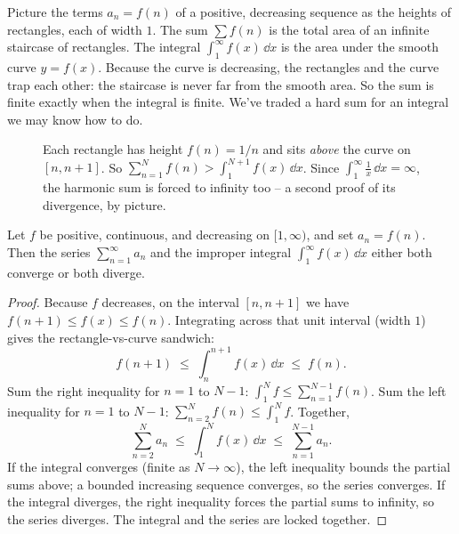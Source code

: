 \begin{intuitionbox}
Picture the terms $a_n = f(n)$ of a positive, decreasing sequence as the heights of rectangles, each of width $1$. The sum $\sum f(n)$ is the total area of an infinite staircase of rectangles. The integral $\int_1^\infty f(x)\,\dd x$ is the area under the smooth curve $y=f(x)$. Because the curve is decreasing, the rectangles and the curve trap each other: the staircase is never far from the smooth area. So the sum is finite exactly when the integral is finite. We've traded a hard sum for an integral we may know how to do.
\end{intuitionbox}

\begin{figure}[H]
\centering
{}
\caption{Each rectangle has height $f(n)=1/n$ and sits \emph{above} the curve on $[n,n+1]$. So $\sum_{n=1}^{N} f(n) > \int_1^{N+1} f(x)\,\dd x$. Since $\int_1^\infty \tfrac1x\,\dd x = \infty$, the harmonic sum is forced to infinity too -- a second proof of its divergence, by picture.}
\label{ch29:fig-integraltest}
\end{figure}

\begin{theorem}
\label{ch29:thm-integral}
Let $f$ be positive, continuous, and decreasing on $[1,\infty)$, and set $a_n = f(n)$. Then the series $\sum_{n=1}^{\infty} a_n$ and the improper integral $\int_1^{\infty} f(x)\,\dd x$ either both converge or both diverge.
\end{theorem}

\begin{proof}
Because $f$ decreases, on the interval $[n, n+1]$ we have $f(n+1) \le f(x) \le f(n)$. Integrating across that unit interval (width $1$) gives the rectangle-vs-curve sandwich:
\[
f(n+1) \;\le\; \int_{n}^{n+1} f(x)\,\dd x \;\le\; f(n).
\]
Sum the right inequality for $n=1$ to $N-1$: $\int_1^{N} f \le \sum_{n=1}^{N-1} f(n)$. Sum the left inequality for $n=1$ to $N-1$: $\sum_{n=2}^{N} f(n) \le \int_1^{N} f$. Together,
\[
\sum_{n=2}^{N} a_n \;\le\; \int_1^{N} f(x)\,\dd x \;\le\; \sum_{n=1}^{N-1} a_n .
\]
If the integral converges (finite as $N\to\infty$), the left inequality bounds the partial sums above; a bounded increasing sequence converges, so the series converges. If the integral diverges, the right inequality forces the partial sums to infinity, so the series diverges. The integral and the series are locked together.
\end{proof}

